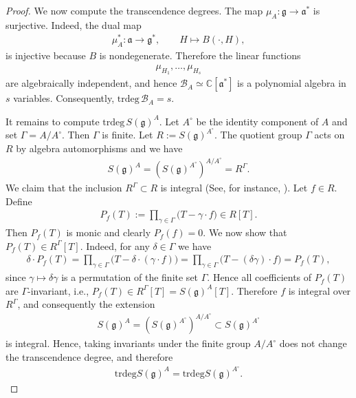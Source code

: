 \documentclass[11pt,reqno]{amsart}
\newtheorem*{theorem A}{Main Theorem A}
\newtheorem*{theorem B}{Main Theorem B}
\newtheorem*{theorem C}{Main Theorem C}
\newtheorem*{theorem D}{Main Theorem D}
\theoremstyle{definition}
\theoremstyle{plain}
\theoremstyle{conclusion}
\begin{document}
\begin{proof}
We now compute the transcendence degrees. The map $\mu_A:\mathfrak{g}\longrightarrow \mathfrak{a}^*$ is surjective. Indeed, the dual map \begin{align*}
\mu_A^*:\mathfrak{a}\longrightarrow \mathfrak{g}^*, \qquad H\longmapsto B(\cdot,H),
\end{align*} is injective because $B$ is nondegenerate. Therefore the linear functions \begin{align*}
\mu_{H_1},\dots,\mu_{H_s}
\end{align*} are algebraically independent, and hence $\mathcal{B}_A\simeq \mathbb{C}[\mathfrak{a}^*]$ is a polynomial algebra in $s$ variables. Consequently, $\mathrm{trdeg}\, \mathcal{B}_A = s$. 

It remains to compute $\mathrm{trdeg \,}S(\mathfrak{g})^A$. Let $A^\circ$ be the identity component of $A$ and set $\Gamma = A/A^\circ$. Then $\Gamma$ is finite. Let $R:= S(\mathfrak{g})^{A^\circ}$. The quotient group $\Gamma$ acts on $R$ by algebra automorphisms and we have \begin{align*}
S(\mathfrak{g})^A = \left(S(\mathfrak{g})^{A^\circ}\right)^{A/A^\circ}=R^{\Gamma}.
\end{align*} We claim that the inclusion $R^{\Gamma}\subset R$ is integral (See, for instance, \cite[Section 5, Proposition 5.1]{AtiyahMacdonald}). Let $f\in R$. Define \begin{align*}
    P_f(T):=\prod_{\gamma\in\Gamma}\bigl(T-\gamma\cdot f\bigr)\in R[T].
\end{align*} Then $P_f(T)$ is monic and clearly $P_f(f)=0$. We now show that $P_f(T)\in R^{\Gamma}[T]$. Indeed, for any $\delta\in\Gamma$ we have \begin{align*}
    \delta\cdot P_f(T)=\prod_{\gamma\in\Gamma}\bigl(T-\delta\cdot(\gamma\cdot f)\bigr)=\prod_{\gamma\in\Gamma}\bigl(T-(\delta\gamma)\cdot f\bigr)=P_f(T),
\end{align*} since $\gamma \mapsto \delta\gamma$ is a permutation of the finite set $\Gamma$. Hence all coefficients of $P_f(T)$ are $\Gamma$-invariant, i.e., $P_f(T)\in R^{\Gamma}[T] = S(\mathfrak{g})^A[T]$. Therefore $f$ is integral over $R^{\Gamma}$, and consequently the extension \begin{align*}
S(\mathfrak{g})^A = \left(S(\mathfrak{g})^{A^\circ}\right)^{A/A^\circ} \subset S(\mathfrak{g})^{A^\circ}
\end{align*} is integral. Hence, taking invariants under the finite group $A/A^\circ$ does not change the transcendence degree, and therefore \begin{align*}
\mathrm{trdeg}S(\mathfrak{g})^A = \mathrm{trdeg}S(\mathfrak{g})^{A^\circ}.
\end{align*} 


\end{proof}
\end{document}
